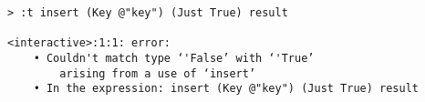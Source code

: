 \begin{repl}\begin{lstlisting}
> :t insert (Key @"key") (Just True) result

<interactive>:1:1: error:
    • Couldn't match type ‘'False’ with ‘'True’
        arising from a use of ‘insert’
    • In the expression: insert (Key @"key") (Just True) result\end{lstlisting}\end{repl}
